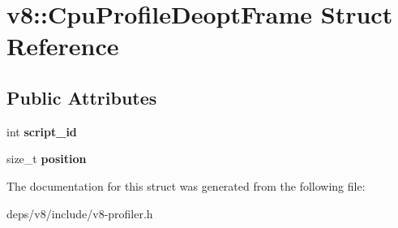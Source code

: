 \hypertarget{structv8_1_1_cpu_profile_deopt_frame}{}\section{v8\+:\+:Cpu\+Profile\+Deopt\+Frame Struct Reference}
\label{structv8_1_1_cpu_profile_deopt_frame}
\subsection*{Public Attributes}
\begin{DoxyCompactItemize}
\item 
\hypertarget{structv8_1_1_cpu_profile_deopt_frame_af7b750288458a70a81b4c05869b8f6d7}{}int {\bfseries script\+\_\+id}\label{structv8_1_1_cpu_profile_deopt_frame_af7b750288458a70a81b4c05869b8f6d7}

\item 
\hypertarget{structv8_1_1_cpu_profile_deopt_frame_a4f82d1517fd15573bb2890961496a76f}{}size\+\_\+t {\bfseries position}\label{structv8_1_1_cpu_profile_deopt_frame_a4f82d1517fd15573bb2890961496a76f}

\end{DoxyCompactItemize}


The documentation for this struct was generated from the following file\+:\begin{DoxyCompactItemize}
\item 
deps/v8/include/v8-\/profiler.\+h\end{DoxyCompactItemize}
